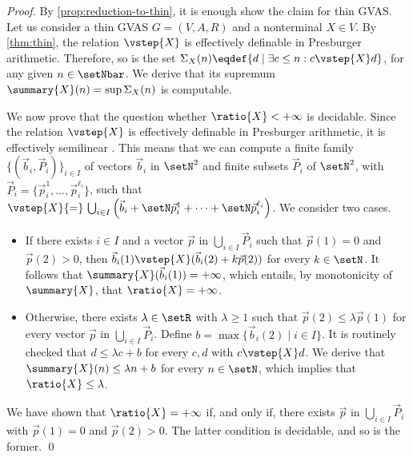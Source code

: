  
\summarycomputableboundedratio*
\begin{proof}
  By \cref{prop:reduction-to-thin}, it is enough show the claim for thin GVAS.
  Let us consider a thin GVAS $G = (V, A, R)$ and a nonterminal $X \in V$.
  By \cref{thm:thin},
  the relation $\vstep{X}$ is effectively definable in Presburger arithmetic.
  Therefore, so is the set
  $\Sigma_X(n) \eqdef \{d \mid \exists c \leq n : c \vstep{X} d\}$,
  for any given $n \in \setNbar$.
  We derive that its supremum $\summary{X}(n) = \sup \Sigma_X(n)$
  is computable.

  \smallskip

  We now prove that the question whether $\ratio{X} < +\infty$
  is decidable.
  Since
  the relation $\vstep{X}$ is effectively definable in
  Presburger arithmetic,
  it is effectively semilinear \cite{Ginsburg:1966:PACIF}.
  This means that we can compute a finite family
  $\{(\vec{b}_i, \vec{P}_i)\}_{i \in I}$ of
  vectors $\vec{b}_i$ in $\setN^2$ and
  finite subsets $\vec{P}_i$ of $\setN^2$,
  with $\vec{P}_i = \{\vec{p}_i^1, \ldots, \vec{p}_i^{\ell_i}\}$,
  such that
  $\vstep{X} {=} \,\bigcup_{i \in I}
   \left(
     \vec{b}_i + \setN\vec{p}_i^1+\cdots+\setN\vec{p}_i^{\ell_i}
   \right)$.
  We consider two cases.
\begin{itemize}
  \item
    If there exists $i \in I$ and a vector $\vec{p}$ in
    $\bigcup_{i \in I} \vec{P}_i$
    such that $\vec{p}(1) = 0$ and $\vec{p}(2) > 0$,
    then $\vec{b}_i(1) \vstep{X} (\vec{b}_i(2) + k \vec{p}(2))$
    for every $k \in \setN$.
    It follows that $\summary{X}(\vec{b}_i(1)) = +\infty$,
    which entails, by monotonicity of $\summary{X}$,
    that $\ratio{X} = +\infty$.
  \item
    Otherwise,
    there exists $\lambda \in \setR$ with $\lambda \geq 1$
    such that $\vec{p}(2) \leq \lambda \vec{p}(1)$ for every
    vector $\vec{p}$ in $\bigcup_{i \in I} \vec{P}_i$.
    Define $b = \max \{\vec{b}_i(2) \mid i \in I\}$.
    It is routinely checked that
    $d \leq \lambda c + b$
    for every $c, d$ with $c \vstep{X} d$.
    We derive that $\summary{X}(n) \leq \lambda n + b$
    for every $n \in \setN$,
    which implies that $\ratio{X} \leq \lambda$.
  \end{itemize}
We have shown that $\ratio{X} = +\infty$ if, and only if,
  there exists $\vec{p}$ in $\bigcup_{i \in I} \vec{P}_i$
  with $\vec{p}(1) = 0$ and $\vec{p}(2) > 0$.
  The latter condition is decidable,
  and so is the former.
  \qed
\end{proof}

